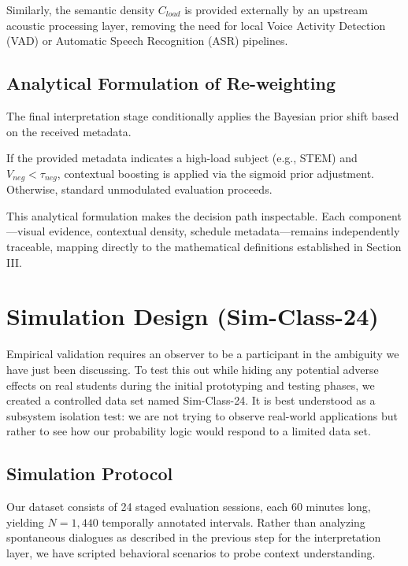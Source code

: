 \documentclass[conference]{IEEEtran}
\begin{document}
Similarly, the semantic density $C_{load}$ is provided externally by an upstream acoustic processing layer, removing the need for local Voice Activity Detection (VAD) or Automatic Speech Recognition (ASR) pipelines.

\subsection{Analytical Formulation of Re-weighting}
The final interpretation stage conditionally applies the Bayesian prior shift based on the received metadata.

If the provided metadata indicates a high-load subject (e.g., STEM) and $V_{neg} < \tau_{neg}$, contextual boosting is applied via the sigmoid prior adjustment. Otherwise, standard unmodulated evaluation proceeds.

This analytical formulation makes the decision path inspectable. Each component—visual evidence, contextual density, schedule metadata—remains independently traceable, mapping directly to the mathematical definitions established in Section III.

\section{Simulation Design (Sim-Class-24)}

Empirical validation requires an observer to be a participant in the ambiguity we have just been discussing. To test this out while hiding any potential adverse effects on real students during the initial prototyping and testing phases, we created a controlled data set named Sim-Class-24. It is best understood as a subsystem isolation test: we are not trying to observe real-world applications but rather to see how our probability logic would respond to a limited data set.

\subsection{Simulation Protocol}
Our dataset consists of 24 staged evaluation sessions, each 60 minutes long, yielding $N = 1,440$ temporally annotated intervals. Rather than analyzing spontaneous dialogues as described in the previous step for the interpretation layer, we have scripted behavioral scenarios to probe context understanding.
\end{document}

